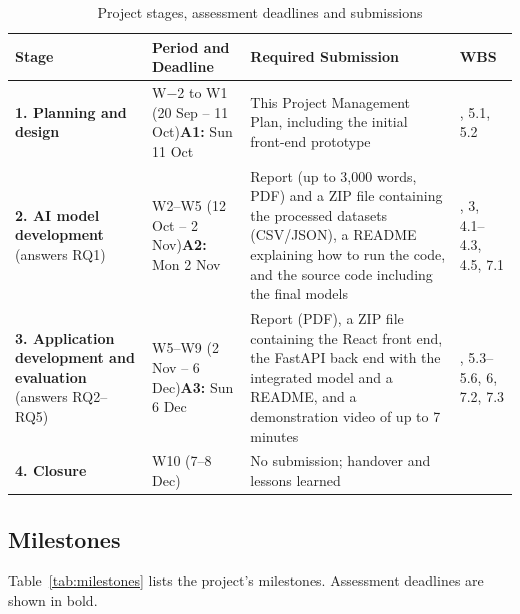 \begin{table}[htbp]
\centering
\caption{Project stages, assessment deadlines and submissions}
\label{tab:stages}
\begin{tabularx}{\textwidth}{@{}>{\raggedright\arraybackslash}p{} >{\raggedright\arraybackslash}p{} >{\raggedright\arraybackslash}X >{\raggedright\arraybackslash}p{}@{}}
  \toprule
  \textbf{Stage} & \textbf{Period and Deadline} & \textbf{Required Submission} & \textbf{WBS} \\
  \midrule
  \textbf{1. Planning and design} & W$-$2 to W1 (20 Sep -- 11 Oct)\newline \textbf{A1:} Sun 11 Oct & This Project Management Plan, including the initial front-end prototype & 1.1, 5.1, 5.2 \\
  \addlinespace
  \textbf{2. AI model development} (answers RQ1) & W2--W5 (12 Oct -- 2 Nov)\newline \textbf{A2:} Mon 2 Nov & Report (up to 3,000 words, PDF) and a ZIP file containing the processed datasets (CSV/JSON), a README explaining how to run the code, and the source code including the final models & 2, 3, 4.1--4.3, 4.5, 7.1 \\
  \addlinespace
  \textbf{3. Application development and evaluation} (answers RQ2--RQ5) & W5--W9 (2 Nov -- 6 Dec)\newline \textbf{A3:} Sun 6 Dec & Report (PDF), a ZIP file containing the React front end, the FastAPI back end with the integrated model and a README, and a demonstration video of up to 7 minutes & 4.4, 5.3--5.6, 6, 7.2, 7.3 \\
  \addlinespace
  \textbf{4. Closure} & W10 (7--8 Dec) & No submission; handover and lessons learned & 7.4 \\
  \bottomrule
\end{tabularx}
\end{table}

\subsection{Milestones}\label{sec:milestones}

Table~\ref{tab:milestones} lists the project's milestones. Assessment deadlines are shown in bold.

